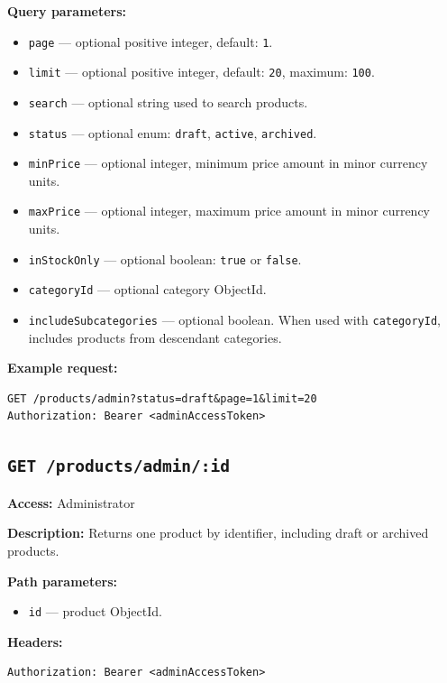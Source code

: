 \textbf{Query parameters:}

\begin{itemize}
    \item \texttt{page} --- optional positive integer, default: \texttt{1}.
    \item \texttt{limit} --- optional positive integer, default: \texttt{20}, maximum: \texttt{100}.
    \item \texttt{search} --- optional string used to search products.
    \item \texttt{status} --- optional enum: \texttt{draft}, \texttt{active}, \texttt{archived}.
    \item \texttt{minPrice} --- optional integer, minimum price amount in minor currency units.
    \item \texttt{maxPrice} --- optional integer, maximum price amount in minor currency units.
    \item \texttt{inStockOnly} --- optional boolean: \texttt{true} or \texttt{false}.
    \item \texttt{categoryId} --- optional category ObjectId.
    \item \texttt{includeSubcategories} --- optional boolean. When used with \texttt{categoryId}, includes products from descendant categories.
\end{itemize}

\textbf{Example request:}

\begin{verbatim}
GET /products/admin?status=draft&page=1&limit=20
Authorization: Bearer <adminAccessToken>
\end{verbatim}

\subsection{\texttt{GET /products/admin/:id}}

\textbf{Access:} Administrator

\textbf{Description:} Returns one product by identifier, including draft or archived products.

\textbf{Path parameters:}

\begin{itemize}
    \item \texttt{id} --- product ObjectId.
\end{itemize}

\textbf{Headers:}

\begin{verbatim}
Authorization: Bearer <adminAccessToken>
\end{verbatim}

